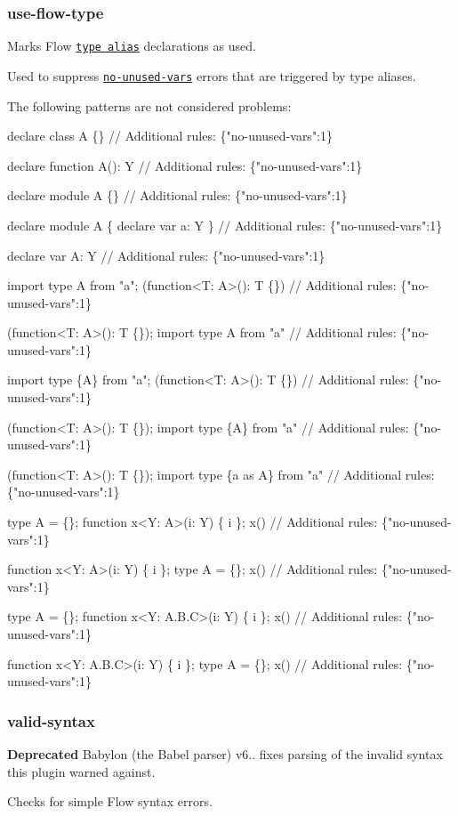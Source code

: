 \label{_eslint-plugin-flowtype-rules-use-flow-type}%
 \subsubsection*{{\ttfamily use-\/flow-\/type}}

Marks Flow \href{https://flowtype.org/docs/type-aliases.html}{\tt type alias} declarations as used.

Used to suppress \href{http://eslint.org/docs/rules/no-unused-vars}{\tt {\ttfamily no-\/unused-\/vars}} errors that are triggered by type aliases.

The following patterns are not considered problems\+:


\begin{DoxyCode}
declare class A \{\}
// Additional rules: \{"no-unused-vars":1\}

declare function A(): Y
// Additional rules: \{"no-unused-vars":1\}

declare module A \{\}
// Additional rules: \{"no-unused-vars":1\}

declare module A \{ declare var a: Y \}
// Additional rules: \{"no-unused-vars":1\}

declare var A: Y
// Additional rules: \{"no-unused-vars":1\}

import type A from "a"; (function<T: A>(): T \{\})
// Additional rules: \{"no-unused-vars":1\}

(function<T: A>(): T \{\}); import type A from "a"
// Additional rules: \{"no-unused-vars":1\}

import type \{A\} from "a"; (function<T: A>(): T \{\})
// Additional rules: \{"no-unused-vars":1\}

(function<T: A>(): T \{\}); import type \{A\} from "a"
// Additional rules: \{"no-unused-vars":1\}

(function<T: A>(): T \{\}); import type \{a as A\} from "a"
// Additional rules: \{"no-unused-vars":1\}

type A = \{\}; function x<Y: A>(i: Y) \{ i \}; x()
// Additional rules: \{"no-unused-vars":1\}

function x<Y: A>(i: Y) \{ i \}; type A = \{\}; x()
// Additional rules: \{"no-unused-vars":1\}

type A = \{\}; function x<Y: A.B.C>(i: Y) \{ i \}; x()
// Additional rules: \{"no-unused-vars":1\}

function x<Y: A.B.C>(i: Y) \{ i \}; type A = \{\}; x()
// Additional rules: \{"no-unused-vars":1\}
\end{DoxyCode}


\label{_eslint-plugin-flowtype-rules-valid-syntax}%
 \subsubsection*{{\ttfamily valid-\/syntax}}

{\bfseries Deprecated} Babylon (the Babel parser) v6.. fixes parsing of the invalid syntax this plugin warned against.

Checks for simple Flow syntax errors. 
